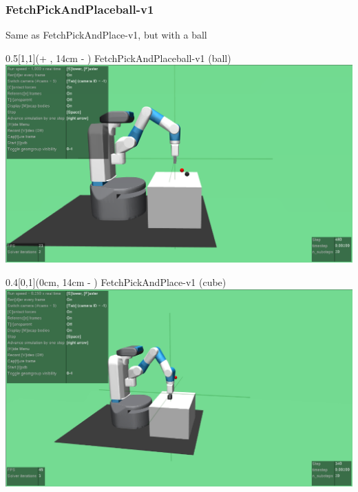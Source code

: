 \begin{frame}
	\frametitle{FetchPickAndPlaceball-v1}	
	\vspace{1cm}
	
	Same as FetchPickAndPlace-v1, but with a ball
	
	
	\begin{textblock*}{0.5\paperwidth}[1,1](\textwidth + \PraesentationSeitenrand, 14cm - \PraesentationSeitenrand)%
		FetchPickAndPlaceball-v1 (ball)
		\includegraphics[width=0.4\paperwidth]{./Ressourcen/Figures/FetchPickAndPlaceball-v1.pdf}
	\end{textblock*}
	
	
	
	\begin{textblock*}{0.4\paperwidth}[0,1](0cm, 14cm - \PraesentationSeitenrand)%
		FetchPickAndPlace-v1 (cube)
		\includegraphics[width=0.4\paperwidth]{./Ressourcen/Figures/FetchPickAndPlace-v1.pdf}
	\end{textblock*}
	
	
	
	
\end{frame}
\clearpage

